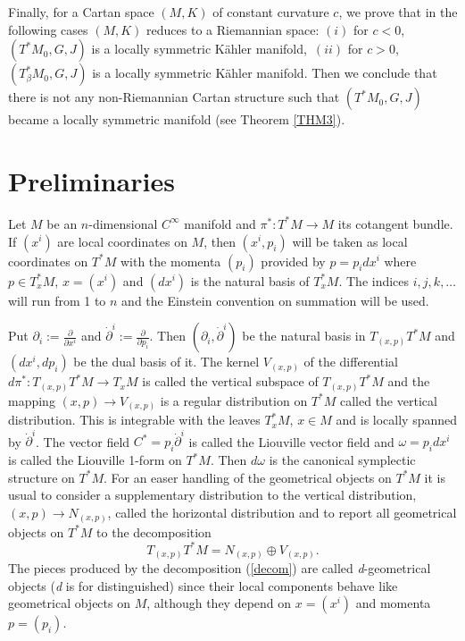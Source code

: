 \documentclass[10pt,a4paper]{article}
\theoremstyle{plain}
\theoremstyle{definition}
\begin{document}
Finally, for a Cartan space $(M,K)$ of  constant curvature $c$, we prove
that in the following cases $(M,K)$  reduces to a Riemannian
space: $(i)$ for $c<0$, $(T^{\ast}M_0,G,J)$ is a locally symmetric
K\"{a}hler manifold,\ $(ii)$ for $c>0$,
$(T_{\beta}^{\ast}M_0,G,J)$ is a locally symmetric K\"{a}hler
manifold. Then we conclude that there is not any non-Riemannian
Cartan structure such that $(T^{\ast}M_0, G, J)$ became a locally
symmetric manifold (see Theorem \ref{THM3}).


\section{Preliminaries}
Let $M$ be an $n$-dimensional $C^{\infty}$ manifold and
$\pi^{\ast}:T^{\ast}M\rightarrow M$ its cotangent bundle. If
$(x^i)$ are local coordinates on $M$, then $(x^i,p_i)$ will be taken
as local coordinates on $T^{\ast}M$ with the momenta $(p_i)$
provided by $p=p_idx^i$ where $p\in T^{\ast}_xM$, $x=(x^i)$ and
$(dx^i)$ is the natural basis of $T^{\ast}_xM$. The indices $i, j,
k,\ldots$ will run from 1 to $n$ and the Einstein convention on
summation will be used.

Put $\partial_i:=\frac{\partial}{\partial
x^i}$ and $\dot{\partial}^i:=\frac{\partial}{\partial p_i}$. Then $(\partial_i, \dot{\partial}^i)$ be the
natural basis in $T_{(x,p)}T^{\ast}M$ and $(dx^i,dp_i)$ be the dual
basis of it. The kernel $V_{(x,p)}$ of the differential
$d\pi^{\ast}:T_{(x,p)}T^{\ast}M\rightarrow T_xM$ is called the
vertical subspace of $T_{(x,p)}T^{\ast}M$ and the mapping
$(x,p)\rightarrow V_{(x,p)}$ is a regular distribution on
$T^{\ast}M$ called the vertical distribution. This is
integrable with the leaves $T^{\ast}_xM$, $x\in M$ and is locally
spanned by $\dot{\partial}^i$. The vector field
$C^{\ast}=p_i\dot{\partial}^i$ is called the Liouville vector field
and $\omega=p_idx^i$ is called the Liouville 1-form on $T^{\ast}M$.
Then $d\omega$ is the canonical symplectic structure on $T^{\ast}M$.
For an easer handling of the geometrical objects on $T^{\ast}M$ it
is usual to consider a supplementary distribution to the vertical
distribution, $(x,p)\rightarrow N_{(x,p)}$, called the
horizontal distribution and to report all geometrical
objects on $T^{\ast}M$ to the decomposition
\begin{equation}
T_{(x,p)}T^{\ast}M=N_{(x,p)}\oplus V_{(x,p)}.\label{decom}
\end{equation}
The pieces produced by the decomposition (\ref{decom}) are called
\textit{d}-geometrical objects (\textit{d} is for distinguished)
since their local components behave like geometrical objects on $M$,
although they depend on $x=(x^i)$ and momenta $p=(p_i)$.
\end{document}
